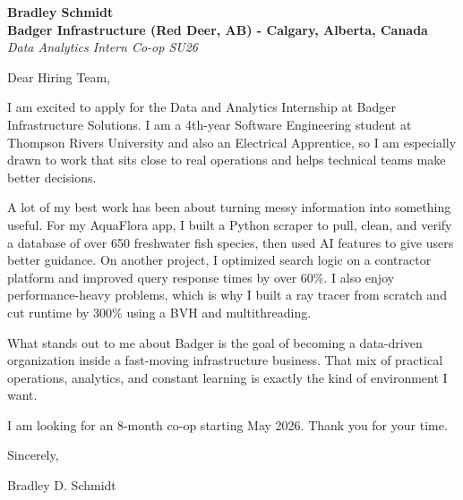 \documentclass[11pt]{article}
\begin{document}
\textbf{Bradley Schmidt}\\
\vspace{0.5em}
\textbf{Badger Infrastructure (Red Deer, AB) - Calgary, Alberta, Canada}\\
\textit{Data Analytics Intern Co-op SU26}

Dear Hiring Team,

\par

I am excited to apply for the Data and Analytics Internship at Badger Infrastructure Solutions. I am a 4th-year Software Engineering student at Thompson Rivers University and also an Electrical Apprentice, so I am especially drawn to work that sits close to real operations and helps technical teams make better decisions.

\par

A lot of my best work has been about turning messy information into something useful. For my AquaFlora app, I built a Python scraper to pull, clean, and verify a database of over 650 freshwater fish species, then used AI features to give users better guidance. On another project, I optimized search logic on a contractor platform and improved query response times by over 60\%. I also enjoy performance-heavy problems, which is why I built a ray tracer from scratch and cut runtime by 300\% using a BVH and multithreading.

\par

What stands out to me about Badger is the goal of becoming a data-driven organization inside a fast-moving infrastructure business. That mix of practical operations, analytics, and constant learning is exactly the kind of environment I want.

\par

I am looking for an 8-month co-op starting May 2026. Thank you for your time.

\par

Sincerely,

\par

Bradley D. Schmidt
\end{document}
